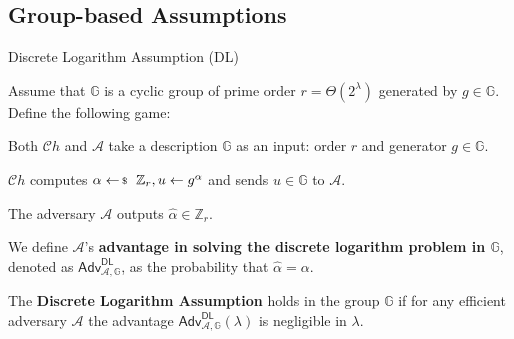 \documentclass{zkdl-presentation-template}
\begin{document}
    \subsection{Group-based Assumptions}
    \begin{frame}{Discrete Logarithm Assumption (DL)}
        \begin{definition}
            Assume that $\mathbb{G}$ is a cyclic group of prime order $r = \Theta(2^{\lambda})$ generated by $g \in \mathbb{G}$. Define the following game:
            \begin{algoen}
                \item Both $\mathcal{C}h$ and $\mathcal{A}$ take a description $\mathbb{G}$ as an input: order $r$ and generator $g \in \mathbb{G}$.
                \item $\mathcal{C}h$ computes $\alpha \leftarrowS \mathbb{Z}_r, u \gets g^{\alpha}$ and sends $u \in \mathbb{G}$ to $\mathcal{A}$.
                \item The adversary $\mathcal{A}$ outputs $\widehat{\alpha} \in \mathbb{Z}_r$.
            \end{algoen}
            We define $\mathcal{A}$'s \textbf{advantage in solving the discrete logarithm problem in $\mathbb{G}$}, denoted as $\textsf{Adv}^{\textsf{DL}}_{\mathcal{A},\mathbb{G}}$, as the probability that $\widehat{\alpha} = \alpha$.
        \end{definition}
        \pause

        \begin{definition}
            The \textbf{Discrete Logarithm Assumption} holds in the group $\mathbb{G}$ if for any efficient adversary $\mathcal{A}$ the advantage $\textsf{Adv}^{\textsf{DL}}_{\mathcal{A},\mathbb{G}}(\lambda)$ is negligible in $\lambda$.
        \end{definition}
    \end{frame}
\end{document}
